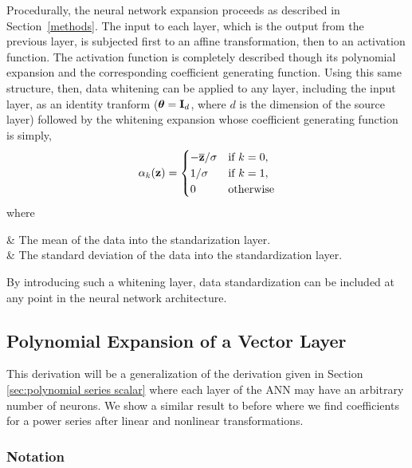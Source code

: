 Procedurally, the neural network expansion proceeds as described in Section~\ref{methods}. The input to each layer, which is the output from the previous layer, is subjected first to an affine transformation, then to an activation function. The activation function is completely described though its polynomial expansion and the corresponding coefficient generating function. Using this same structure, then, data whitening can be applied to any layer, including the input layer, as an identity tranform ($\boldsymbol{\theta} = {\bf I}_d$, where $d$ is the dimension of the source layer) followed by the whitening expansion whose coefficient generating function is simply,
\begin{equation}
    \alpha_k({\bf z}) = \begin{cases}
        -\overline{\bf z}/\sigma    & \mbox{if } k = 0, \\
        1/\sigma                    & \mbox{if } k = 1, \\
        0                           & \mbox{otherwise}
    \end{cases}
\end{equation}
where
\begin{conditions}
        & The mean of the data into the standarization layer. \\
    \sigma              & The standard deviation of the data into the standardization layer.
\end{conditions}
By introducing such a whitening layer, data standardization can be included at any point in the neural network architecture.


\subsection{Polynomial Expansion of a Vector Layer}
\label{sec:polynomial series vector}

This derivation will be a generalization of the derivation given in Section \ref{sec:polynomial series scalar} where each layer of the ANN may have an arbitrary number of neurons. We show a similar result to before where we find coefficients for a power series after linear and nonlinear transformations.

\subsubsection{Notation}

